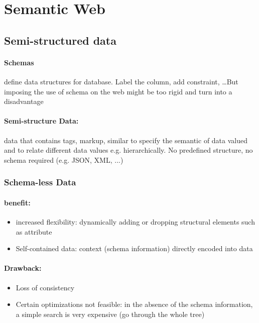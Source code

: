 \section{Semantic Web}


\subsection{Semi-structured data}

\paragraph{Schemas} define data structures for database. Label the column, add constraint,
\dots But imposing the use of schema on the web might be too rigid and turn into a disadvantage

\paragraph{Semi-structure Data:} data that contains tags, markup, similar to specify the semantic of data valued and to relate different data values e.g. hierarchically. No predefined structure, no schema required (e.g. JSON, XML, ...)

\subsubsection{Schema-less Data}

\paragraph{benefit:}

\begin{itemize}
\item increased flexibility: dynamically adding or dropping structural elements such as attribute
\item Self-contained data: context (schema information) directly encoded into data
\end{itemize}

\paragraph{Drawback:}

\begin{itemize}
\item Loss of consistency
\item Certain optimizations not feasible: in the absence of the schema information, a simple search is very expensive (go through the whole tree)
\end{itemize}

